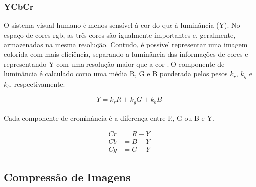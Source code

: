 \subsubsection{YCbCr}

O sistema visual humano é menos sensível à cor do que à luminância (Y). No espaço de cores \acrshort{rgb}, as três cores são igualmente importantes e, geralmente, armazenadas na mesma resolução. Contudo, é possível representar uma imagem colorida com mais eficiência, separando a luminância das informações de cores e representando Y com uma resolução maior que a cor \cite{richardson2010h}. O componente de luminância é calculado como uma média R, G e B ponderada pelos pesos $k_r$, $k_g$ e $k_b$, respectivamente.

\begin{equation}
\begin{aligned}
Y = k_rR + k_gG + k_bB 
\end{aligned}
\end{equation}

Cada componente de crominância é a diferença entre R, G ou B e Y.

\begin{equation}
\begin{aligned}
Cr &= R - Y \\
Cb &= B - Y \\
Cg &= G - Y
\end{aligned}
\end{equation}






\subsection{Compressão de Imagens}


